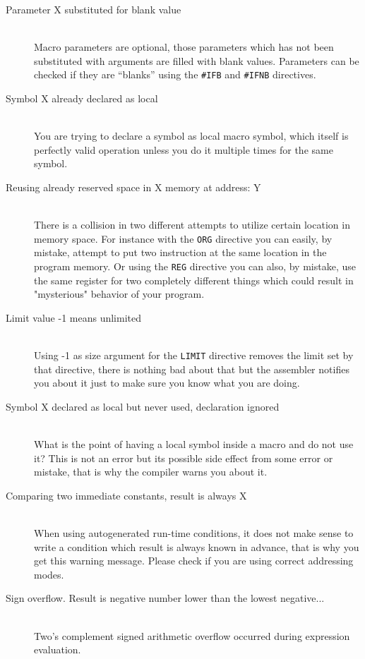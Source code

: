 \begin{description}
        \item[Parameter X substituted for blank value]~\\
            Macro parameters are optional, those parameters which has not been substituted with arguments are filled with blank values. Parameters can be checked if they are ``blanks'' using the \texttt{\#IFB} and \texttt{\#IFNB} directives.
        \item[Symbol X already declared as local]~\\
            You are trying to declare a symbol as local macro symbol, which itself is perfectly valid operation unless you do it multiple times for the same symbol.
        \item[Reusing already reserved space in X memory at address: Y]~\\
            There is a collision in two different attempts to utilize certain location in memory space. For instance with the \texttt{ORG} directive you can easily, by mistake, attempt to put two instruction at the same location in the program memory. Or using the \texttt{REG} directive you can also, by mistake, use the same register for two completely different things which could result in "mysterious" behavior of your program.
        \item[Limit value -1 means unlimited]~\\
            Using -1 as size argument for the \texttt{LIMIT} directive removes the limit set by that directive, there is nothing bad about that but the assembler notifies you about it just to make sure you know what you are doing.
        \item[Symbol X declared as local but never used, declaration ignored]~\\
            What is the point of having a local symbol inside a macro and do not use it? This is not an error but its possible side effect from some error or mistake, that is why the compiler warns you about it.
        \item[Comparing two immediate constants, result is always X]~\\
            When using autogenerated run-time conditions, it does not make sense to write a condition which result is always known in advance, that is why you get this warning message. Please check if you are using correct addressing modes.
        \item[Sign overflow. Result is negative number lower than the lowest negative...]~\\
            Two's complement signed arithmetic overflow occurred during expression evaluation.

\end{description}

